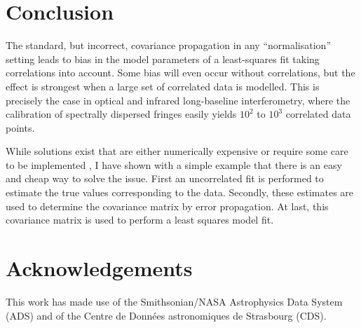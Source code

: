 \documentclass[a4paper,fleqn,usenatbib]{mnras}
\begin{document}
\section{Conclusion}
\label{sec:conclusion}

The standard, but incorrect, covariance propagation in any ``normalisation'' setting leads to bias in the model parameters of a least-squares fit taking correlations into account.  Some bias will even occur without correlations, but the effect is strongest when a large set of correlated data is modelled.  This is precisely the case in optical and infrared long-baseline interferometry, where the calibration of spectrally dispersed fringes easily yields $10^2$ to $10^3$ correlated data points.

While solutions exist that are either numerically expensive or require some care to be implemented \citep{BUR11,BEC12,NIS14}, I have shown with a simple example that there is an easy and cheap way to solve the issue. First an uncorrelated fit is performed to estimate the true values corresponding to the data.  Secondly, these estimates are used to determine the covariance matrix by error propagation. At last, this covariance matrix is used to perform a least squares model fit.

\section*{Acknowledgements}
This work has made use of the Smithsonian/NASA Astrophysics Data System (ADS) and of the Centre de Données astronomiques de Strasbourg (CDS).


\end{document}
